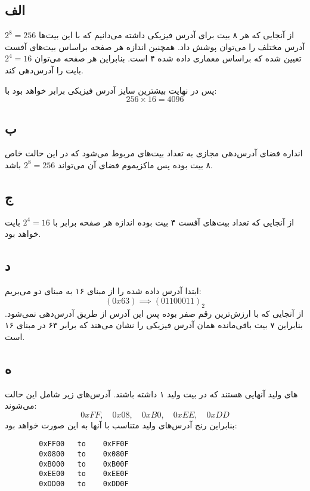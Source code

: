 \subsection*{الف}
از آنجایی که هر
۸ بیت برای آدرس فیزیکی داشته می‌دانیم که با این بیت‌ها
$2^8 = 256$
آدرس مختلف را می‌توان پوشش داد. همچنین اندازه هر صفحه براساس بیت‌های آفست تعیین شده که براساس معماری داده شده ۴ است. بنابراین هر صفحه می‌توان
$2^4 = 16$
بایت را آدرس‌دهی کند.

پس در نهایت بیشترین سایز آدرس فیزیکی برابر خواهد بود با:
\[
  256 \times 16 = 4096  
\]

\subsection*{ب}
انداره فضای آدرس‌دهی مجازی به تعداد بیت‌های
مربوط می‌شود که در این حالت خاص ۸ بیت بوده پس ماکزیموم فضای آن می‌تواند
$2^8 = 256$
باشد.

\subsection*{ج}
از آنجایی که تعداد بیت‌های آفست ۴ بیت بوده اندازه هر صفحه برابر با‍
$2^4 = 16$
بایت خواهد بود.

\subsection*{د}
ابتدا آدرس داده شده را از مبنای ۱۶ به مبنای دو می‌بریم:
\[
    (0x63) \implies (01100011)_2
\]
از آنجایی که با ارزش‌ترین رقم صفر بوده پس این آدرس از طریق
آدرس‌دهی نمی‌شود. بنابراین ۷ بیت باقی‌مانده همان آدرس فیزیکی را نشان می‌هند که برابر ۶۳ در مبنای ۱۶ است.

\subsection*{ه}
های ولید آنهایی هستند که در
بیت ولید ۱ داشته باشند. آدرس‌های زیر شامل این حالت می‌شوند:
\[
    0xFF, \quad 0x08, \quad 0xB0, \quad 0xEE, \quad 0xDD 
\]
بنابراین رنج آدرس‌های ولید متناسب با آنها به این صورت خواهد بود:
\begin{latin}
    \begin{verbatim}
        0xFF00   to    0xFF0F
        0x0800   to    0x080F
        0xB000   to    0xB00F
        0xEE00   to    0xEE0F
        0xDD00   to    0xDD0F
    \end{verbatim}
\end{latin}
